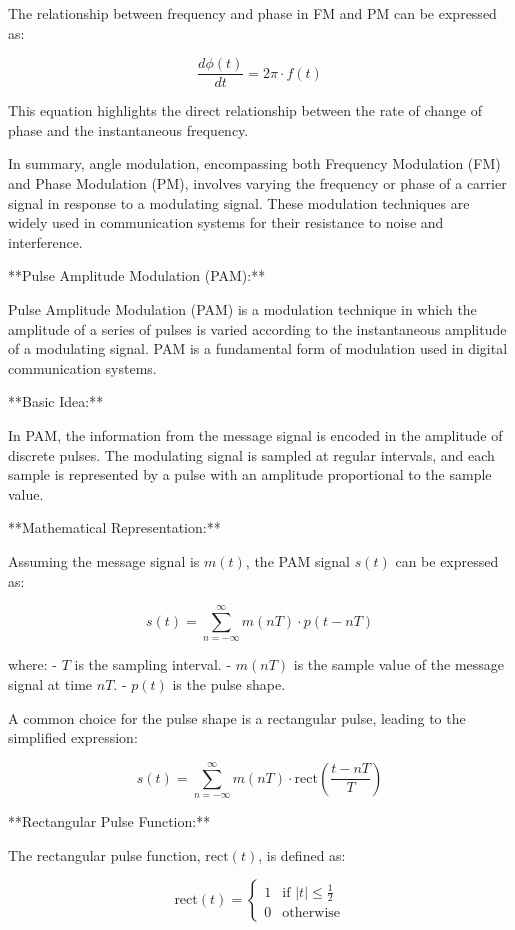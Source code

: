 \documentclass[../../../../DMCC-My-Notebook]{subfiles}
\begin{document}
	The relationship between frequency and phase in FM and PM can be expressed as:
	
	\[ \frac{d\phi(t)}{dt} = 2\pi \cdot f(t) \]
	
	This equation highlights the direct relationship between the rate of change of phase and the instantaneous frequency.
	
	In summary, angle modulation, encompassing both Frequency Modulation (FM) and Phase Modulation (PM), involves varying the frequency or phase of a carrier signal in response to a modulating signal. These modulation techniques are widely used in communication systems for their resistance to noise and interference.
	
	
	
	
	**Pulse Amplitude Modulation (PAM):**
	
	Pulse Amplitude Modulation (PAM) is a modulation technique in which the amplitude of a series of pulses is varied according to the instantaneous amplitude of a modulating signal. PAM is a fundamental form of modulation used in digital communication systems.
	
	**Basic Idea:**
	
	In PAM, the information from the message signal is encoded in the amplitude of discrete pulses. The modulating signal is sampled at regular intervals, and each sample is represented by a pulse with an amplitude proportional to the sample value.
	
	**Mathematical Representation:**
	
	Assuming the message signal is \(m(t)\), the PAM signal \(s(t)\) can be expressed as:
	
	\[ s(t) = \sum_{n=-\infty}^{\infty} m(nT) \cdot p(t - nT) \]
	
	where:
	- \( T \) is the sampling interval.
	- \( m(nT) \) is the sample value of the message signal at time \(nT\).
	- \( p(t) \) is the pulse shape.
	
	A common choice for the pulse shape is a rectangular pulse, leading to the simplified expression:
	
	\[ s(t) = \sum_{n=-\infty}^{\infty} m(nT) \cdot \text{rect}\left(\frac{t - nT}{T}\right) \]
	
	**Rectangular Pulse Function:**
	
	The rectangular pulse function, \(\text{rect}(t)\), is defined as:
	
	\[ \text{rect}(t) = 
	\begin{cases} 
		1 & \text{if } |t| \leq \frac{1}{2} \\
		0 & \text{otherwise}
	\end{cases}
	\]
	
\end{document}
